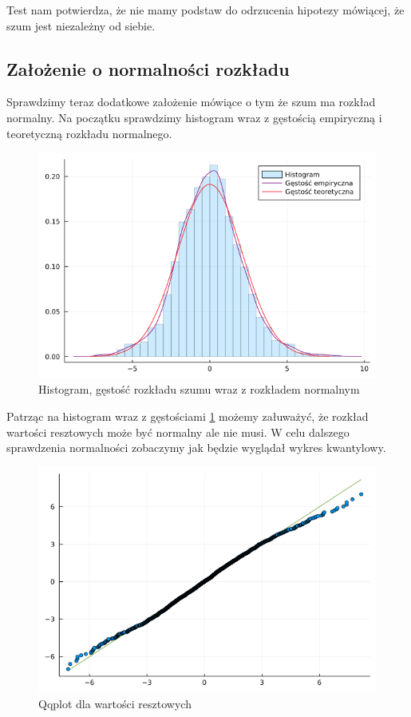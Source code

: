 \documentclass[12pt]{article}
\theoremstyle{exer}
\begin{document}
Test nam potwierdza, że nie mamy podstaw do odrzucenia hipotezy mówiącej, że szum jest niezależny od siebie.

\subsection{Założenie o normalności rozkładu}
Sprawdzimy teraz dodatkowe założenie mówiące o tym że szum ma rozkład normalny.
Na początku sprawdzimy histogram wraz z gęstością empiryczną i teoretyczną rozkładu normalnego.
\begin{figure}[H]
	\centering
	\includegraphics[width=3\columnwidth/4]{img/density.png}
	\caption{Histogram, gęstość rozkładu szumu wraz z rozkładem normalnym}
	\label{fig:density}
\end{figure}

Patrząc na histogram wraz z gęstościami \ref{fig:density} możemy załuważyć, że rozkład wartości resztowych może być normalny ale nie musi. W celu dalszego sprawdzenia normalności zobaczymy jak będzie wyglądał wykres kwantylowy.

\begin{figure}[H]
	\centering
	\includegraphics[width=3\columnwidth/4]{img/qqplot.png}
	\caption{Qqplot dla wartości resztowych}
	\label{fig:qqplot}
\end{figure}
\end{document}

